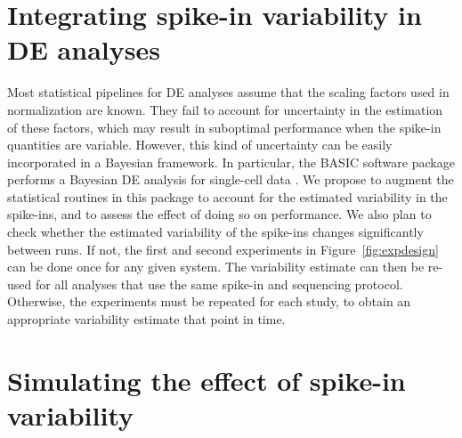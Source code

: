 \documentclass{article}
\begin{document}
\section{Integrating spike-in variability in DE analyses}
Most statistical pipelines for DE analyses assume that the scaling factors used in normalization are known.
They fail to account for uncertainty in the estimation of these factors, which may result in suboptimal performance when the spike-in quantities are variable.
However, this kind of uncertainty can be easily incorporated in a Bayesian framework.
In particular, the BASIC software package performs a Bayesian DE analysis for single-cell data \cite{cata?}.
We propose to augment the statistical routines in this package to account for the estimated variability in the spike-ins, and to assess the effect of doing so on performance.
We also plan to check whether the estimated variability of the spike-ins changes significantly between runs.
If not, the first and second experiments in Figure~\ref{fig:expdesign} can be done once for any given system.
The variability estimate can then be re-used for all analyses that use the same spike-in and sequencing protocol.
Otherwise, the experiments must be repeated for each study, to obtain an appropriate variability estimate that point in time.




\newpage

\section{Simulating the effect of spike-in variability}
\end{document}
